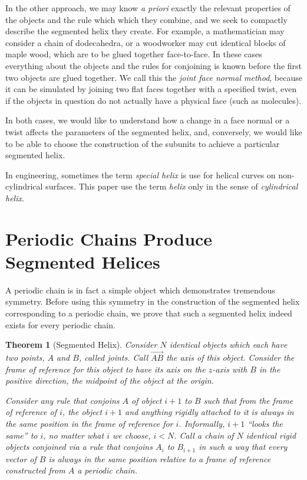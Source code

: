 \documentclass[11pt]{article}
\newtheorem{theorem}{Theorem}
\begin{document}
{In the other approach, we may know {\it a priori} exactly the
relevant properties of the objects and the rule which which they combine, and we seek to compactly describe the segmented helix they create.
For example, a mathematician may consider a chain of dodecahedra, or a woodworker may cut identical blocks of maple wood,
which are to be glued together face-to-face. In these cases everything about the objects and the rules for conjoining
is known before the first two objects are glued together. We call this the {\em joint face normal method}, because
it can be simulated by joining two flat faces together with a specified twist, even if the objects in question
do not actually have a physical face (such as molecules).

In both cases, we would like to understand how a change in a face normal or a twist affects the parameters
of the segmented helix,
and, conversely, we would like to be able to choose the construction of the subunits to achieve a particular segmented helix.

In engineering, sometimes the term {\em special helix}\cite{gu2012research} is use for helical curves on non-cylindrical surfaces. This paper use the term {\em helix} only in the sense of {\em cylindrical helix}.

\section{Periodic Chains Produce Segmented Helices}

A periodic chain is in fact a simple object which demonstrates tremendous symmetry.
Before using this symmetry in the construction of the segmented helix corresponding to a periodic chain, we
prove that such a segmented helix indeed exists for every periodic chain.

\begin{theorem}[Segmented Helix]
  Consider $N$ identical objects which each have two points, $A$ and $B$, called {\em joints}. Call
  $\overrightarrow{AB}$ the {\em axis} of this object.
  Consider the frame of reference for this object to have
  its axis on the $z$-axis with $B$ in the positive direction, the
  midpoint of the object at the origin.

  Consider any rule that conjoins $A$ of object $i+1$ to $B$ such that
  from the frame of reference of $i$, the object $i+1$ and anything rigidly
  attached to it is always in the same position in the frame of reference for $i$.
  Informally, $i+1$ ``looks the same'' to $i$, no matter what $i$ we choose, $i < N$.
  Call a chain of $N$ identical rigid objects conjoined via a rule that
  conjoins $A_i$ to $B_{i+1}$ in such a way that every vector
  of $B$ is always in the same position relative to a frame of reference
  constructed from $A$ a {\em periodic chain.}


\end{theorem}}
\end{document}
